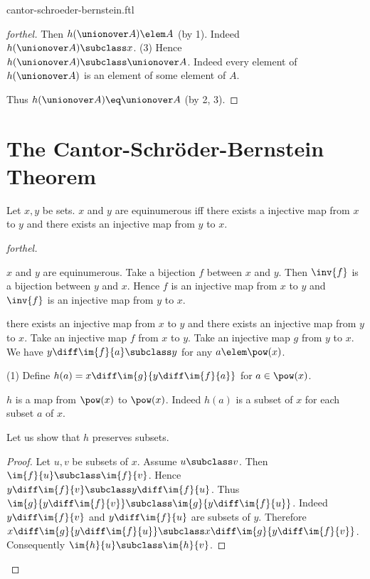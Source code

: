 \documentclass{article}
\begin{document}
\begin{smodule}{cantor-schroeder-bernstein.ftl}
\begin{proof}[forthel]
  Then $h(\unionover A) \elem A$ (by 1).
  Indeed $h(\unionover A) \subclass x$.
  (3) Hence $h(\unionover A) \subclass \unionover A$.
  Indeed every element of $h(\unionover A)$ is an element of some element of $A$.

  Thus $h(\unionover A) \eq \unionover A$ (by 2, 3).
\end{proof}


\section*{The Cantor-Schröder-Bernstein Theorem}

\begin{theorem}[forthel,title=Cantor-Schröder-Bernstein,id=cantor_schroeder_bernstein]
  Let $x,y$ be sets.
  $x$ and $y$ are equinumerous iff there exists a injective map from $x$ to $y$ and there exists an injective map from $y$ to $x$.
\end{theorem}
\begin{proof}[forthel]
  \begin{case}{$x$ and $y$ are equinumerous.}
    Take a bijection $f$ between $x$ and $y$.
    Then $\inv{f}$ is a bijection between $y$ and $x$.
    Hence $f$ is an injective map from $x$ to $y$ and $\inv{f}$ is an
    injective map from $y$ to $x$.
  \end{case}

  \begin{case}{there exists an injective map from $x$ to $y$ and there exists an injective map from $y$ to $x$.}
    Take an injective map $f$ from $x$ to $y$.
    Take an injective map $g$ from $y$ to $x$.
    We have $y \diff \im{f}{a} \subclass y$ for any $a \elem \pow(x)$.

    (1) Define $h(a) = x \diff \im{g}{y \diff \im{f}{a}}$ for $a \in \pow(x)$. %

    $h$ is a map from $\pow(x)$ to $\pow(x)$.
    Indeed $h(a)$ is a subset of $x$ for each subset $a$ of $x$.

    Let us show that $h$ preserves subsets.
    \begin{proof}
      Let $u, v$ be subsets of $x$.
      Assume $u \subclass v$.
      Then $\im{f}{u} \subclass \im{f}{v}$.
      Hence $y \diff \im{f}{v} \subclass y \diff \im{f}{u}$.
      Thus $\im{g}{y \diff \im{f}{v}} \subclass \im{g}{y \diff \im{f}{u}}$.
      Indeed $y \diff \im{f}{v}$ and $y \diff \im{f}{u}$ are subsets of $y$. %
      Therefore $x \diff \im{g}{y \diff \im{f}{u}} \subclass x \diff \im{g}{y \diff \im{f}{v}}$.
      Consequently $\im{h}{u} \subclass \im{h}{v}$.
    \end{proof}


\end{case}
\end{proof}
\end{smodule}
\end{document}
